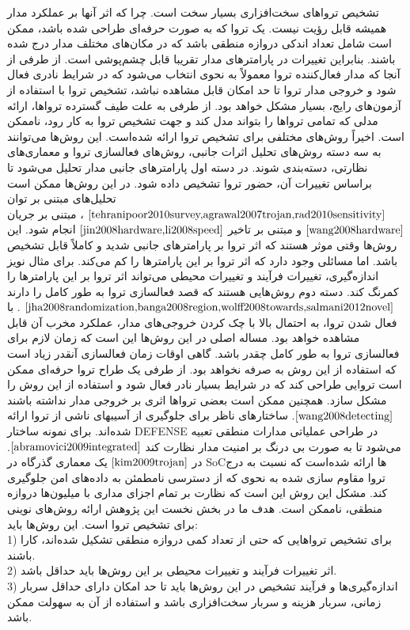 تشخیص تروا‌های سخت‌افزاری بسیار سخت است. چرا که اثر آنها بر عملکرد مدار همیشه قابل رؤیت نیست. یک تروا که به صورت حرفه‌ای طراحی شده باشد، ممکن است شامل تعداد اندکی دروازه منطقی باشد که در مکان‌های مختلف مدار درج شده باشند. بنابراین تغییرات در پارامترهای مدار تقریبا قابل چشم‌پوشی است. از طرفی از آنجا که مدار فعال‌کننده تروا معمولاً به نحوی انتخاب می‌شود که در شرایط نادری فعال شود و خروجی مدار تروا تا حد امکان قابل مشاهده نباشد، تشخیص تروا با استفاده از آزمون‌های رایج، بسیار مشکل خواهد بود. از طرفی به  علت طیف گسترده تروا‌ها، ارائه مدلی که تمامی تروا‌ها را بتواند مدل کند و جهت تشخیص تروا به کار رود، ناممکن است.
اخیراً روش‌های مختلفی برای تشخیص تروا ارائه شده‌است. این روش‌ها می‌توانند به سه دسته روش‌های تحلیل اثرات جانبی، روش‌های فعالسازی تروا و معماری‌های نظارتی، دسته‌بندی شوند. در دسته اول پارامترهای جانبی مدار تحلیل می‌شود تا براساس تغییرات آن، حضور تروا تشخیص داده شود. در این روش‌ها ممکن است تحلیل‌های مبتنی بر توان
$\cite{tehranipoor2010survey,agrawal2007trojan,rad2010sensitivity}$
، مبتنی بر جریان
$\cite{wang2008hardware}$
و مبتنی بر تاخیر
$\cite{jin2008hardware,li2008speed}$
انجام شود. این روش‌ها وقتی موثر هستند که اثر تروا بر پارامترهای جانبی شدید و کاملاً قابل تشخیص باشد. اما مسائلی وجود دارد که اثر تروا بر این پارامترها را کم می‌کند. برای مثال نویز اندازه‌گیری، تغییرات فرآیند و تغییرات محیطی می‌تواند اثر تروا بر این پارامترها را کمرنگ کند.
دسته دوم روش‌هایی هستند که قصد فعالسازی تروا به طور کامل را دارند
$ \cite{jha2008randomization,banga2008region,wolff2008towards,salmani2012novel}$
. با فعال شدن تروا، به احتمال بالا با چک کردن خروجی‌ها‌‌ی مدار، عملکرد مخرب آن قابل مشاهده خواهد بود. مساله اصلی در این روش‌ها این است که زمان لازم برای فعالسازی تروا به طور کامل چقدر باشد. گاهی اوقات زمان فعالسازی آنقدر زیاد است که استفاده از این روش به صرفه نخواهد بود. از طرفی یک طراح تروا حرفه‌ای ممکن است تروایی طراحی کند که در شرایط بسیار نادر فعال شود و استفاده از این روش را مشکل سازد. همچنین ممکن است بعضی تروا‌ها اثری بر خروجی مدار نداشته باشند $\cite{wang2008detecting}$.
ساختارهای ناظر برای جلوگیری از آسیبهای ناشی از تروا ارائه شده‌اند. برای نمونه ساختار DEFENSE در طراحی عملیاتی مدارات منطقی تعبیه می‌شود تا به صورت بی درنگ بر امنیت مدار نظارت کند $\cite{abramovici2009integrated}$. در $\cite{kim2009trojan}$ یک معماری گذرگاه در SoC‌ها‌‌ ارائه شده‌است که نسبت به درج تروا مقاوم سازی شده به نحوی که از دسترسی نامطمئن به داده‌های امن جلوگیری کند. مشکل این روش این است که نظارت بر تمام اجزای مداری با میلیون‌ها دروازه منطقی، ناممکن است.
هدف ما در بخش نخست این پژوهش ارائه روش‌های نوینی برای تشخیص تروا است. این روش‌ها باید:
\\
1) برای تشخیص تروا‌هایی که حتی از تعداد کمی دروازه منطقی تشکیل شده‌اند، کارا باشند.
\\
2) اثر تغییرات فرآیند و تغییرات محیطی بر این روش‌ها باید حداقل باشد.
\\
3) اندازه‌گیری‌ها و فرآیند تشخیص در این روش‌ها باید تا حد امکان دارای حداقل سربار زمانی، سربار هزینه و سربار سخت‌افزاری باشد و استفاده از آن به سهولت ممکن باشد.

